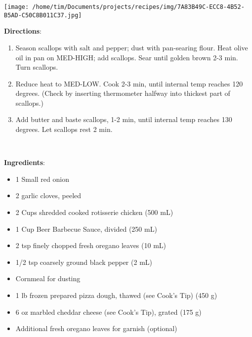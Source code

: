\documentclass[11pt, twoside, openany]{book}
\begin{document}
\begin{minipage}[t]{0.2\linewidth}
\centering \strut\vspace*{-\baselineskip}\newline
\texttt{[image: /home/tim/Documents/projects/recipes/img/7A83B49C-ECC8-4B52-B5AD-C50C8B011C37.jpg]}\\
\end{minipage}\vspace{3mm}
\textbf{Directions}:
\vspace{-3mm}\begin{enumerate}\setlength\itemsep{-1mm}
\item Season scallops with salt and pepper; dust with pan-searing flour. Heat olive oil in pan on MED-HIGH; add scallops. Sear until golden brown 2-3 min. Turn scallops.
\item Reduce heat to MED-LOW. Cook 2-3 min, until internal temp reaches 120 degrees. (Check by inserting thermometer halfway into thickest part of scallops.)
\item Add butter and baste scallops, 1-2 min, until internal temp reaches 130 degrees. Let scallops rest 2 min.
\end{enumerate}
 \label{grilled-bbq-chicken-pizza}\hfill\textit{}\\
\begin{minipage}[t]{0.8\linewidth}
\textbf{Ingredients}:\vspace{-3mm}
\begin{multicols}{2}
\begin{itemize}\setlength\itemsep{-1mm}
\item 1 Small red onion
\item 2 garlic cloves, peeled
\item 2 Cups shredded cooked rotisserie chicken (500 mL)
\item 1 Cup Beer Barbecue Sauce, divided (250 mL)
\item 2 tsp finely chopped fresh oregano leaves (10 mL)
\item 1/2 tsp coarsely ground black pepper (2 mL)
\item Cornmeal for dusting
\item 1 lb frozen prepared pizza dough, thawed (see Cook's Tip) (450 g)
\item 6 oz marbled cheddar cheese (see Cook's Tip), grated (175 g)
\item Additional fresh oregano leaves for garnish (optional)
\end{itemize}
\end{multicols}
\end{minipage}
\end{document}
